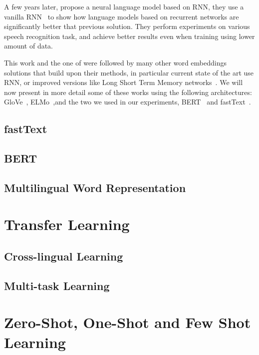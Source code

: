 A few years later, \citet{Mikolov2010RecurrentNN} propose a neural language model based on RNN, they use a vanilla RNN~\citep{elman1990finding} to show how language models based on recurrent networks are significantly better that previous solution. They perform experiments on various speech recognition task, and achieve better results even when training using lower amount of data.

This work and the one of \cite{bengio2003nnlm} were followed by many other word embeddings solutions that build upon their methods, in particular current state of the art use RNN, or improved versions like Long Short Term Memory networks~\citep{hochreiter1997long}. We will now present in more detail some of these works using the following architectures: GloVe~\citep{pennington2014glove}, ELMo~\citep{peters2018elmo},and the two we used in our experiments, BERT~\citep{devlin2018bert} and fastText~\citep{bojanowski2016enriching}.



\subsection{fastText}
\subsection{BERT}


\subsection{Multilingual Word Representation}

\section{Transfer Learning}
\label{sec:transfer_learning}
\subsection{Cross-lingual Learning}
\subsection{Multi-task Learning}
 
\section{Zero-Shot, One-Shot and Few Shot Learning} 
\label{sec:zero_learning}

